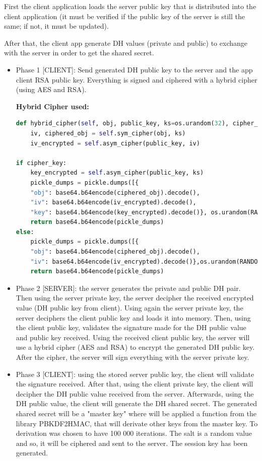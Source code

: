 \documentclass[pdftex,12pt,a4paper]{report}
\begin{document}
First the client application loads the server public key that is distributed into the client application (it must be verified if the public key of the server is still the same; if not, it must be updated).

After that, the client app generate DH values (private and public) to exchange with the server in order to get the shared secret.

\begin{itemize}
    \item Phase 1 [CLIENT]: Send generated DH public key to the server and the app client RSA public key. Everything is signed and ciphered with a hybrid cipher (using AES and RSA).
    
\textbf{Hybrid Cipher used:}
\begin{lstlisting}[language=Python]
def hybrid_cipher(self, obj, public_key, ks=os.urandom(32), cipher_key=True):
    iv, ciphered_obj = self.sym_cipher(obj, ks)
    iv_encrypted = self.asym_cipher(public_key, iv)

if cipher_key:
    key_encrypted = self.asym_cipher(public_key, ks)
    pickle_dumps = pickle.dumps([{
    "obj": base64.b64encode(ciphered_obj).decode(),
    "iv": base64.b64encode(iv_encrypted).decode(), 
    "key": base64.b64encode(key_encrypted).decode()}, os.urandom(RANDOM_ENTROPY_GENERATOR_SIZE])
    return base64.b64encode(pickle_dumps)
else:
    pickle_dumps = pickle.dumps([{
    "obj": base64.b64encode(ciphered_obj).decode(),
    "iv": base64.b64encode(iv_encrypted).decode()},os.urandom(RANDOM_ENTROPY_GENERATOR_SIZE)])
    return base64.b64encode(pickle_dumps)
\end{lstlisting}

    \item Phase 2 [SERVER]: the server generates the private and public DH pair. Then using the server private key, the server decipher the received encrypted value (DH public key from client). Using again the server private key, the server deciphers the client public key and loads it into memory.
    Then, using the client public key, validates the signature made for the DH public value and public key received.
    Using the received client public key, the server will use a hybrid cipher (AES and RSA) to encrypt the generated DH public key. After the cipher, the server will sign everything with the server private key.

    \item Phase 3 [CLIENT]: using the stored server public key, the client will validate the signature received. After
    that, using the client private key, the client will decipher the DH public value received from the server. Afterwards, using the DH public value, the client will generate the DH shared secret. The generated shared secret will be a "master key" where will be applied a function from the library PBKDF2HMAC, that will derivate other keys from the master key. To derivation was chosen to have 100 000 iterations. The salt is a random value and so, it will be ciphered and sent to the server.
    The session key has been generated.


\end{itemize}
\end{document}
